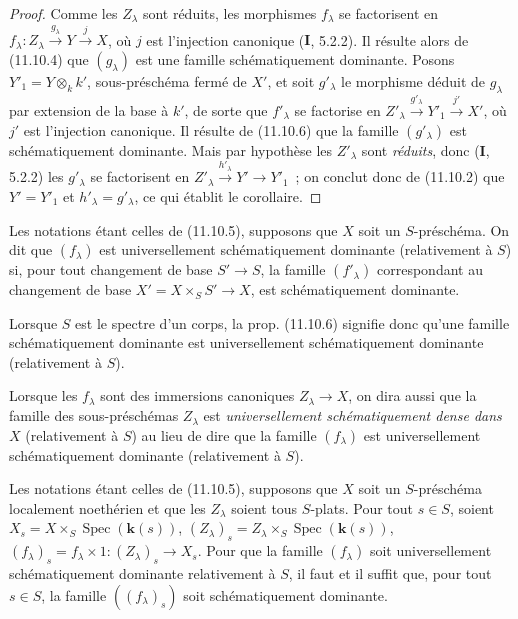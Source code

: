 \begin{proof}
Comme les $Z_\lambda$ sont réduits, les morphismes $f_\lambda$ se factorisent
en $f_\lambda:Z_\lambda\xrightarrow{g_\lambda}Y\xrightarrow{j}X$,
où $j$ est l'injection canonique ($\mathbf I$, 5.2.2). Il résulte alors de
(11.10.4) que $(g_\lambda)$ est une famille schématiquement dominante. Posons
$Y'_1=Y\otimes_k k'$, sous-préschéma fermé de $X'$, et soit $g'_\lambda$ le
morphisme déduit de $g_\lambda$ par extension de la base à $k'$, de sorte que
$f'_\lambda$ se factorise en
$Z'_\lambda\xrightarrow{g'_\lambda}Y'_1\xrightarrow{j'}X'$,
où $j'$ est l'injection canonique. Il résulte de (11.10.6) que la famille
$(g'_\lambda)$ est schématiquement dominante. Mais par hypothèse les
$Z'_\lambda$ sont \emph{réduits}, donc ($\mathbf I$, 5.2.2) les
$g'_\lambda$ se factorisent en $Z'_\lambda\xrightarrow{h'_\lambda}Y'\to Y'_1$~; on conclut donc
de (11.10.2) que $Y'=Y'_1$ et $h'_\lambda=g'_\lambda$, ce qui établit le
corollaire.
\end{proof}

\begin{definition}[11.10.8]
\label{IV.11.10.8-fr}
Les notations étant celles de \textup{(11.10.5)}, supposons que $X$ soit un
$S$-préschéma. On dit que $(f_\lambda)$ est universellement
schématiquement dominante (relativement à $S$) si, pour tout changement de
base $S'\to S$, la famille $(f'_\lambda)$ correspondant au changement de base
$X'=X\times_SS'\to X$, est schématiquement dominante.
\end{definition}

Lorsque $S$ est le spectre d'un corps, la prop. (11.10.6) signifie donc qu'une
famille schématiquement dominante est universellement schématiquement
dominante (relativement à $S$).

Lorsque les $f_\lambda$ sont des immersions canoniques $Z_\lambda\to X$, on
dira aussi que la famille des sous-préschémas $Z_\lambda$ est
\emph{universellement schématiquement dense dans $X$} (relativement à $S$) au
lieu de dire que la famille $(f_\lambda)$ est universellement schématiquement
dominante (relativement à $S$).

\begin{theorem}[11.10.9]
\label{IV.11.10.9-fr}
Les notations étant celles de \textup{(11.10.5)}, supposons que $X$ soit un
$S$-préschéma localement noethérien et que les $Z_\lambda$ soient tous
$S$-plats. Pour tout $s\in S$, soient
$X_s=X\times_S\operatorname{Spec}(\boldsymbol{k}(s))$,
$(Z_\lambda)_s=Z_\lambda\times_S\operatorname{Spec}(\boldsymbol{k}(s))$,
$(f_\lambda)_s=f_\lambda\times1:(Z_\lambda)_s\to X_s$. Pour que la famille
$(f_\lambda)$ soit universellement schématiquement dominante relativement à
$S$, il faut et il suffit que, pour tout $s\in S$, la famille
$((f_\lambda)_s)$ soit schématiquement dominante.
\end{theorem}

